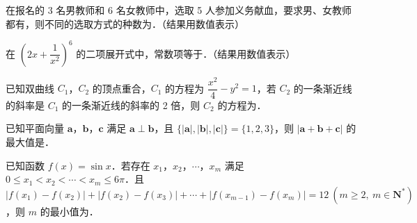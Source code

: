 \begin{question}
在报名的 3 名男教师和 6 名女教师中，选取 5 人参加义务献血，要求男、女教师都有，则不同的选取方式的种数为\gkblank{}．（结果用数值表示）

\end{question}
\begin{question}
在 \(\left(2x+\dfrac{1}{x^{2}}\right)^{6}\) 的二项展开式中，常数项等于\gkblank{}．（结果用数值表示）

\end{question}
\begin{question}
已知双曲线 \(C_{1}\)，\(C_{2}\) 的顶点重合，\(C_{1}\) 的方程为 \(\dfrac{x^{2}}{4}-y^{2}=1\)，若 \(C_{2}\) 的一条渐近线的斜率是 \(C_{1}\) 的一条渐近线的斜率的 2 倍，则 \(C_{2}\) 的方程为\gkblank{}．

\end{question}
\begin{question}
已知平面向量 \(\boldsymbol{a}\)，\(\boldsymbol{b}\)，\(\boldsymbol{c}\) 满足 \(\boldsymbol{a}\perp\boldsymbol{b}\)，且 \(\{|\boldsymbol{a}|,|\boldsymbol{b}|,|\boldsymbol{c}|\}=\{1,2,3\}\)，则 \(|\boldsymbol{a}+\boldsymbol{b}+\boldsymbol{c}|\) 的最大值是\gkblank{}．

\end{question}
\begin{question}
已知函数 \(f(x)=\sin x\)．若存在 \(x_{1}\)，\(x_{2}\)，\(\cdots\)，\(x_{m}\) 满足 \(0\leqslant x_{1}<x_{2}<\cdots<x_{m}\leqslant 6\pi\)．且 \(|f(x_{1})-f(x_{2})|+|f(x_{2})-f(x_{3})|+\cdots+|f(x_{m-1})-f(x_{m})|=12\ (m\geqslant 2,\ m\in\mathbf{N}^{*})\)，则 \(m\) 的最小值为\gkblank{}．

\end{question}

